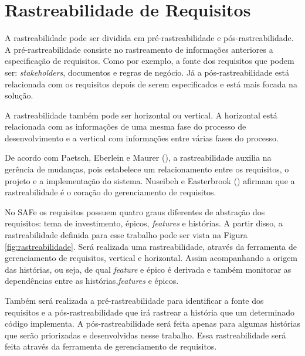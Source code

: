 \section[Rastreabilidade de Requisitos]{Rastreabilidade de Requisitos}

A rastreabilidade pode ser dividida em pré-rastreabilidade e pós-rastreabilidade. 
A pré-rastreabilidade consiste no rastreamento de informações anteriores a especificação
de requisitos. Como por exemplo, a fonte dos requisitos que podem ser: \textit{stakeholders},
documentos e regras de negócio. Já a pós-rastreabilidade está relacionada com os requisitos depois 
de serem especificados e está mais focada na solução. \cite{persson}

A rastreabilidade também pode ser horizontal ou vertical. A horizontal está relacionada com
as informações de uma mesma fase do processo de desenvolvimento e a vertical
com informações entre várias fases do processo. \cite{persson}

De acordo com Paetsch, Eberlein e Maurer (\citeyear{paetsch}), a rastreabilidade auxilia na gerência de mudanças, 
pois estabelece um relacionamento entre os requisitos, o projeto e a implementação do sistema. Nuseibeh e Easterbrook (\citeyear{nuseibeh})
afirmam que a rastreabilidade é o coração do gerenciamento de requisitos.

No SAFe os requisitos possuem quatro graus diferentes de abstração dos requisitos: tema de investimento, épicos, \textit{features} e histórias.
A partir disso, a rastreabilidade definida para esse trabalho pode ser vista na Figura \ref{fig:rastreabilidade}.
Será realizada uma rastreabilidade, através da ferramenta de gerenciamento de requisitos, vertical e horizontal. Assim acompanhando
a origem das histórias, ou seja, de qual \textit{feature} e épico é derivada e também monitorar as dependências entre as histórias,\textit{features} e épicos.

Também será realizada a pré-rastreabilidade para identificar a fonte dos requisitos e a pós-rastreabilidade que irá rastrear a história que um determinado
código implementa. A pós-rastreabilidade será feita apenas para algumas histórias que serão priorizadas e desenvolvidas nesse trabalho.
Essa rastreabilidade será feita através da ferramenta de gerenciamento de requisitos.

\graphicspath{{figuras/}}

